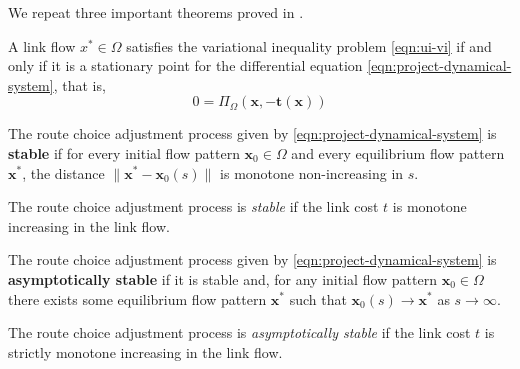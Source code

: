 We repeat three important theorems proved in \citet{nagurney1997projected}.

\begin{theorem}
    \label{thm:correspondence}
    A link flow $x^*\in \Omega$ satisfies the variational inequality problem \eqref{eqn:ui-vi} if and only if it is a stationary point for the differential equation \eqref{eqn:project-dynamical-system}, that is,
    $$0= \Pi_{\Omega}(\mathbf{x}, -\mathbf{t}(\mathbf{x}))$$
\end{theorem}

\begin{definition}[Stability]
    \label{def:stability}
    The route choice adjustment process given by \eqref{eqn:project-dynamical-system} is \textbf{stable} if for every initial flow pattern $\mathbf{x}_0\in \Omega$ and every equilibrium flow pattern $\mathbf{x}^*$, the distance $\|\mathbf{x}^* - \mathbf{x}_0(s)\|$ is monotone non-increasing in $s$.
\end{definition}

\begin{theorem}
    The route choice adjustment process is \textit{stable} if the link cost $t$ is monotone increasing in the link flow.
\end{theorem}

\begin{definition}
     The route choice adjustment process given by \eqref{eqn:project-dynamical-system} is \textbf{asymptotically stable} if it is stable and, for any initial flow pattern $\mathbf{x}_0\in \Omega$ there exists some  equilibrium flow pattern $\mathbf{x}^*$ such that $\mathbf{x}_0(s) \to \mathbf{x}^*$ as $s\to \infty$.
\end{definition}

\begin{theorem}
    \label{thm:convergence}
    The route choice adjustment process is \textit{asymptotically stable} if the link cost $t$ is strictly monotone increasing in the link flow.
\end{theorem}

